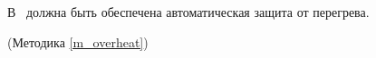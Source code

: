 В \dut \ должна быть обеспечена автоматическая защита от перегрева.

\begin{flushright}
(Методика \ref{m_overheat})
\end{flushright}
